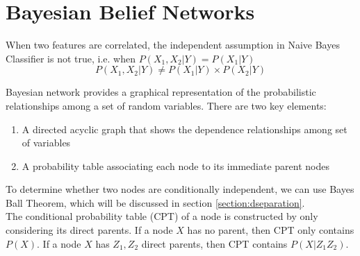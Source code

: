 \chapter{Bayesian Belief Networks}
\begin{multicols*}{2}

\noindent When two features are correlated, the independent assumption in Naive Bayes Classifier is not true, i.e. when $P(X_1 , X_2 | Y) = P(X_1 | Y)$
$$P(X_1 , X_2 | Y) \ne P(X_1 | Y) \times P(X_2 | Y)$$

\noindent Bayesian network provides a graphical representation of the probabilistic relationships among a set of random variables. There are two key elements:

\begin{enumerate}
    \item A directed acyclic graph that shows the dependence relationships among set of variables
    \item A probability table associating each node to its immediate parent nodes
\end{enumerate}

\noindent To determine whether two nodes are conditionally independent, we can use Bayes Ball Theorem, which will be discussed in section \ref{section:dseparation}. \\

\noindent The conditional probability table (CPT) of a node is constructed by only considering its direct parents. If a node $X$ has no parent, then CPT only contains $P(X)$. If a node $X$ has $Z_1, Z_2$ direct parents, then CPT contains $P(X|Z_1Z_2)$.

\end{multicols*}
